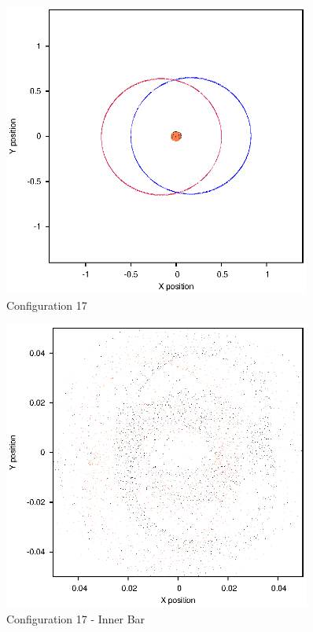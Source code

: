 \documentclass[a4paper,12pt]{article}
\begin{document}
\begin{figure}[H]
\centering
\includegraphics[width=0.9\textwidth]{./2017results/05-75-05-35/Orbit.eps}
\caption{Configuration 17}
\label{fig:config17}
\end{figure}
\begin{figure}[H]
\centering
\includegraphics[width=0.9\textwidth]{./2017results/05-75-05-35/Inner.eps}
\caption{Configuration 17 - Inner Bar}
\label{fig:config17i}
\end{figure}
\end{document}
